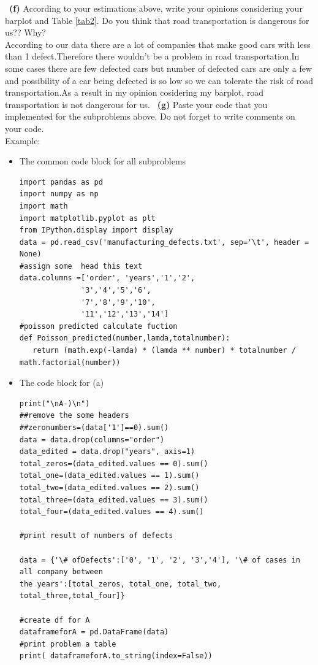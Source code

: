 \documentclass[a4 paper]{article}
\numberwithin{equation}{section}
\newcommand{\subproblem}[1]{~\newline\textbf{(#1)}}
\newcommand{\0}{\mathbf{0}}
\begin{document}
	\subproblem{f} According to your estimations above, write your opinions considering your barplot and Table \ref{tab2}. Do you think that road transportation is dangerous for us?? Why?\\
	According to our data there are a lot of companies that make good cars with less than 1 defect.Therefore there wouldn’t be a problem in road transportation.In some cases there are few defected cars but number of defected cars are only a few and possibility of a car being defected is so low so we can tolerate the risk of road transportation.As a result in my opinion cosidering my barplot, road transportation is not  dangerous for us.
	\subproblem{g} Paste your code that you implemented for the subproblems above. Do not forget to write comments on your code.\\
	Example:\\
	\begin{itemize}
		\item The common code block for all subproblems\\
		\begin{lstlisting}
import pandas as pd
import numpy as np
import math
import matplotlib.pyplot as plt
from IPython.display import display
data = pd.read_csv('manufacturing_defects.txt', sep='\t', header = None)
#assign some  head this text 
data.columns =['order', 'years','1','2',
              '3','4','5','6',
              '7','8','9','10',
              '11','12','13','14']
#poisson predicted calculate fuction
def Poisson_predicted(number,lamda,totalnumber):
   return (math.exp(-lamda) * (lamda ** number) * totalnumber / math.factorial(number))              
\end{lstlisting}
\end{itemize}
	\begin{itemize}
		\item The code block for (a) \\
		\begin{lstlisting}
print("\nA-)\n")
##remove the some headers
##zeronumbers=(data['1']==0).sum()
data = data.drop(columns="order")
data_edited = data.drop("years", axis=1)
total_zeros=(data_edited.values == 0).sum()
total_one=(data_edited.values == 1).sum()
total_two=(data_edited.values == 2).sum()
total_three=(data_edited.values == 3).sum()
total_four=(data_edited.values == 4).sum()

#print result of numbers of defects

data = {'\# ofDefects':['0', '1', '2', '3','4'], '\# of cases in all company between 
the years':[total_zeros, total_one, total_two, total_three,total_four]}  

#create df for A 
dataframeforA = pd.DataFrame(data) 
#print problem a table
print( dataframeforA.to_string(index=False))
 \end{lstlisting}
\end{itemize}
\end{document}

